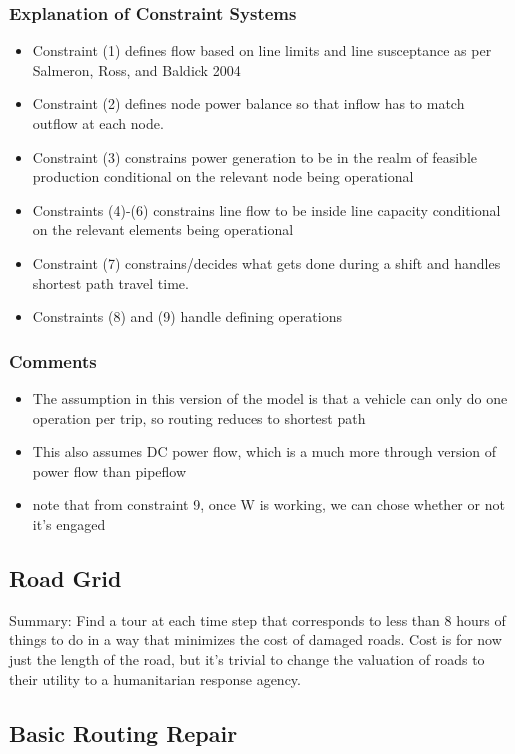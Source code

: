 \documentclass{article}
\begin{document}
	\subsubsection{Explanation of Constraint Systems}
	\begin{itemize}
		\item Constraint (1) defines flow based on line limits and line susceptance as per Salmeron, Ross, and Baldick 2004
		\item Constraint (2) defines node power balance so that inflow has to match outflow at each node.
		\item Constraint (3) constrains power generation to be in the realm of feasible production conditional on the relevant node being operational
		\item Constraints (4)-(6) constrains line flow to be inside line capacity conditional on the relevant elements being operational
		\item Constraint (7) constrains/decides what gets done during a shift and handles shortest path travel time.
		\item Constraints (8) and (9) handle defining operations
	\end{itemize}
	\subsubsection{Comments}
	\begin{itemize}
		\item The assumption in this version of the model is that a vehicle can only do one operation per trip, so routing reduces to shortest path
		\item This also assumes DC power flow, which is a much more through version of power flow than pipeflow
		\item note that from constraint 9, once W is working, we can chose whether or not it's engaged
	\end{itemize}
	\subsection{Road Grid}
	Summary: Find a tour at each time step that corresponds to less than 8 hours of things to do in a way that minimizes the cost of damaged roads. Cost is for now just the length of the road, but it's trivial to change the valuation of roads to their utility to a humanitarian response agency.
	\subsection{Basic Routing Repair}
\end{document}
